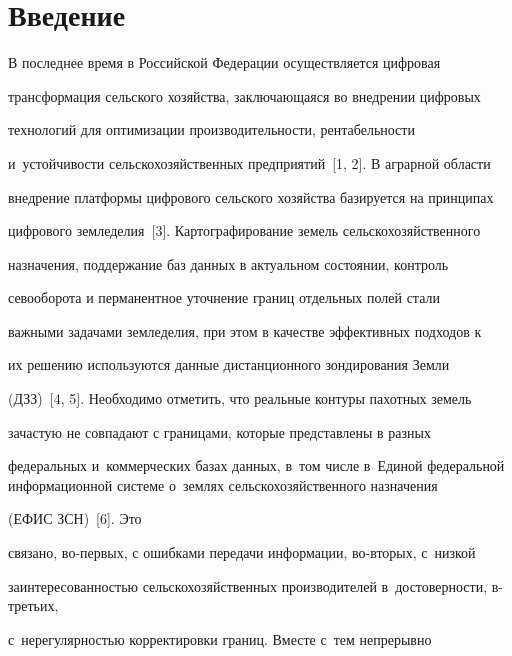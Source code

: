 


 \thispagestyle{headings}

 

 \vspace*{-12pt}



\section{Введение}



\vspace*{-4pt}



  В последнее время в Российской Федерации осуществляется цифровая 

трансформация сельского хозяйства, заключающаяся во внедрении цифровых 

технологий для оптимизации производительности, рентабельности 

и~устойчивости сельскохозяйственных предприятий~[1, 2]. В аграрной области 

внедрение платформы цифрового сельского хозяйства базируется на принципах 

цифрового земледелия~[3]. Картографирование земель сельскохозяйственного 

назначения, поддержание баз данных в актуальном состоянии, контроль 

севооборота и перманентное уточнение границ отдельных полей стали 

важными задачами земледелия, при этом в качестве эффективных подходов к 

их решению используются данные дистанционного зондирования Земли 

(ДЗЗ)~[4, 5]. Необходимо отметить, что реальные контуры пахотных земель 

зачастую не совпадают с границами, которые представлены в разных 

федеральных и~коммерческих базах данных, в~том числе в~Единой федеральной информационной сис\-те\-ме о~землях сельскохозяйственного назначения

(ЕФИС ЗСН)~[6]. Это 

связано, во-пер\-вых, с ошибками передачи информации, во-вто\-рых, с~низкой 

заинтересованностью сельскохозяйственных производителей в~достоверности, в-треть\-их, 

с~нерегулярностью корректировки границ. Вместе с~тем непрерывно 

